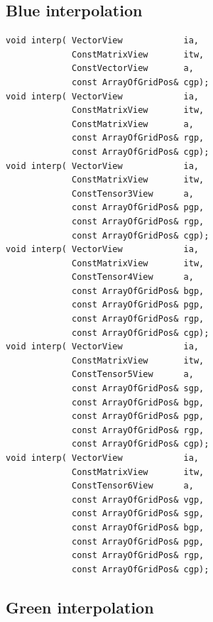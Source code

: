 \subsection{Blue interpolation}

\begin{lstlisting}
void interp( VectorView            ia,
             ConstMatrixView       itw,
             ConstVectorView       a,    
             const ArrayOfGridPos& cgp);
void interp( VectorView            ia,
             ConstMatrixView       itw,
             ConstMatrixView       a,    
             const ArrayOfGridPos& rgp,
             const ArrayOfGridPos& cgp);
void interp( VectorView            ia,
             ConstMatrixView       itw,
             ConstTensor3View      a,    
             const ArrayOfGridPos& pgp,
             const ArrayOfGridPos& rgp,
             const ArrayOfGridPos& cgp);
void interp( VectorView            ia,
             ConstMatrixView       itw,
             ConstTensor4View      a,    
             const ArrayOfGridPos& bgp,
             const ArrayOfGridPos& pgp,
             const ArrayOfGridPos& rgp,
             const ArrayOfGridPos& cgp);
void interp( VectorView            ia,
             ConstMatrixView       itw,
             ConstTensor5View      a,    
             const ArrayOfGridPos& sgp,
             const ArrayOfGridPos& bgp,
             const ArrayOfGridPos& pgp,
             const ArrayOfGridPos& rgp,
             const ArrayOfGridPos& cgp);
void interp( VectorView            ia,
             ConstMatrixView       itw,
             ConstTensor6View      a,    
             const ArrayOfGridPos& vgp,
             const ArrayOfGridPos& sgp,
             const ArrayOfGridPos& bgp,
             const ArrayOfGridPos& pgp,
             const ArrayOfGridPos& rgp,
             const ArrayOfGridPos& cgp);
\end{lstlisting}

\subsection{Green interpolation}

